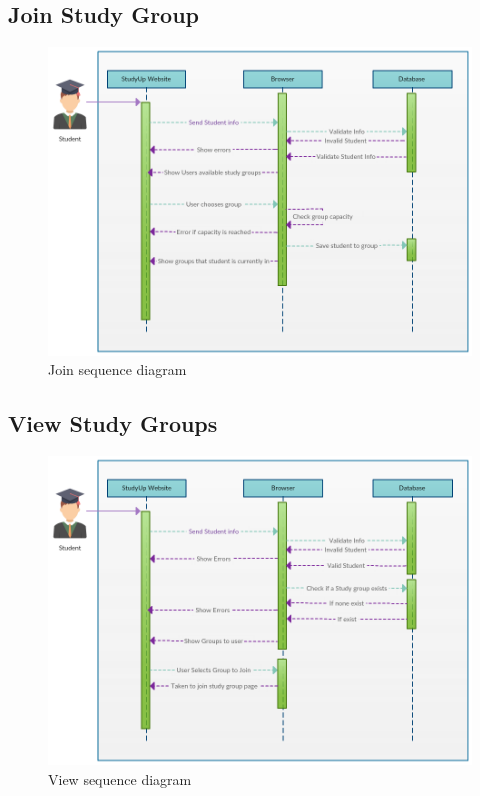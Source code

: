 \documentclass[12pt,letterpaper]{article}
\begin{document}
\clearpage
\subsection{Join Study Group}
\begin{figure}[!htb]
  \includegraphics[width=\linewidth]{Join_Study_Group.png}
  \caption{Join sequence diagram}
  \label{join_sequence}
\end{figure}

\clearpage
\subsection{View Study Groups}
\begin{figure}[!htb]
  \includegraphics[width=\linewidth]{View_Study_Groups.png}
  \caption{View sequence diagram}
  \label{view_sequence}
\end{figure}
\end{document}
